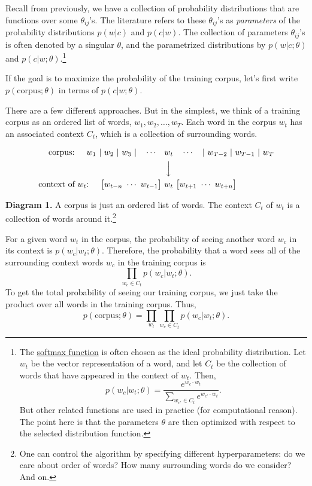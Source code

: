 \documentclass[11pt]{article}
\begin{document}
Recall from previously, we have a collection of probability
distributions that are functions over some \(\theta_{ij}\)'s. The
literature refers to these \(\theta_{ij}\)'s as \emph{parameters} of the
probability distributions \(p(w|c)\) and \(p(c|w)\). The collection of
parameters \(\theta_{ij}\)'s is often denoted by a singular \(\theta\),
and the parametrized distributions by \(p(w|c;\theta)\) and
\(p(c|w;\theta)\).\footnote{The
  \href{https://en.wikipedia.org/wiki/Softmax_function}{softmax
  function} is often chosen as the ideal probability distribution. Let
  \(w_t\) be the vector representation of a word, and let \(C_t\) be the
  collection of words that have appeared in the context of \(w_t\).
  Then,
  \[p(w_c|w_t;\theta) = \frac{e^{w_c \cdot w_t}}{\sum_{w_{c'} \in C_t} e^{w_{c'} \cdot w_t}}.\]
  But other related functions are used in practice (for computational
  reason). The point here is that the parameters \(\theta\) are then
  optimized with respect to the selected distribution function.}

If the goal is to maximize the probability of the training corpus, let's
first write \(p(\textrm{corpus};\theta)\) in terms of \(p(c|w;\theta)\).

There are a few different approaches. But in the simplest, we think of a
training corpus as an ordered list of words, \(w_1, w_2, \dotsc, w_T\).
Each word in the corpus \(w_t\) has an associated context \(C_t\), which
is a collection of surrounding words.

\begin{align*}
\textrm{corpus: }\quad w_1\ | \ w_2\ | \ w_3\ | \quad \dotsm \quad & w _t \quad \dotsm \quad |\ w_{T-2} \ | \ w_{T-1} \ | \ w_T\\
& \,\Big\downarrow\\
\textrm{context of }w_t\textrm{: }\quad \big[ w_{t-n}\ \dotsm\ w_{t-1}\big]\ &w_t \ \big[w_{t+1}\ \dotsm\  w_{t+n} \big]
\end{align*}

\textbf{Diagram 1.} A corpus is just an ordered list of words. The
context \(C_t\) of \(w_t\) is a collection of words around it.\footnote{One
  can control the algorithm by specifying different hyperparameters: do
  we care about order of words? How many surrounding words do we
  consider? And on.}

For a given word \(w_t\) in the corpus, the probability of seeing
another word \(w_c\) in its context is \(p(w_c|w_t;\theta)\). Therefore,
the probability that a word sees all of the surrounding context words
\(w_c\) in the training corpus is
\[\prod_{w_c \in C_t} p(w_c|w_t;\theta).\] To get the total probability
of seeing our training corpus, we just take the product over all words
in the training corpus. Thus,
\[p(\textrm{corpus};\theta) = \prod_{w_t}\prod_{w_c \in C_t} p(w_c|w_t;\theta).\]
\end{document}
